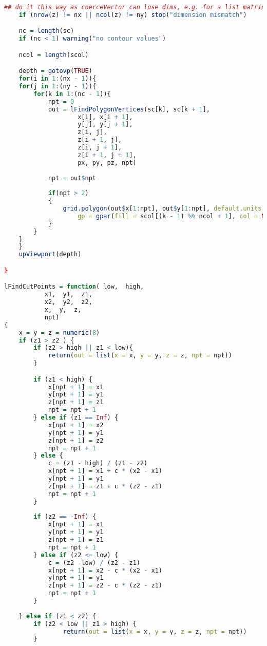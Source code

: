 \begin{lstlisting}[language = R]
    ## do it this way as coerceVector can lose dims, e.g. for a list matrix
    if (nrow(z) != nx || ncol(z) != ny) stop("dimension mismatch")

    nc = length(sc)
    if (nc < 1) warning("no contour values")

    ncol = length(scol)

    depth = gotovp(TRUE)
    for(i in 1:(nx - 1)){
    for(j in 1:(ny - 1)){
        for(k in 1:(nc - 1)){
            npt = 0
            out = lFindPolygonVertices(sc[k], sc[k + 1],
                    x[i], x[i + 1],
                    y[j], y[j + 1],
                    z[i, j],
                    z[i + 1, j],
                    z[i, j + 1],
                    z[i + 1, j + 1],
                    px, py, pz, npt)
            
            npt = out$npt
            
            if(npt > 2)
            { 
                grid.polygon(out$x[1:npt], out$y[1:npt], default.units = 'native',
                    gp = gpar(fill = scol[(k - 1) %% ncol + 1], col = NA), name = 'filled.contour')
            }
        }
    }
    }
    upViewport(depth)

}

lFindCutPoints = function( low,  high,
           x1,  y1,  z1,
           x2,  y2,  z2,
           x,  y,  z,
           npt)
{
    x = y = z = numeric(8)
    if (z1 > z2 ) {
        if (z2 > high || z1 < low){
            return(out = list(x = x, y = y, z = z, npt = npt))
        }

        if (z1 < high) {
            x[npt + 1] = x1
            y[npt + 1] = y1
            z[npt + 1] = z1
            npt = npt + 1
        } else if (z1 == Inf) {
            x[npt + 1] = x2
            y[npt + 1] = y1
            z[npt + 1] = z2
            npt = npt + 1
        } else {
            c = (z1 - high) / (z1 - z2)
            x[npt + 1] = x1 + c * (x2 - x1)
            y[npt + 1] = y1
            z[npt + 1] = z1 + c * (z2 - z1)
            npt = npt + 1
        }
        
        if (z2 == -Inf) {
            x[npt + 1] = x1
            y[npt + 1] = y1
            z[npt + 1] = z1
            npt = npt + 1
        } else if (z2 <= low) {
            c = (z2 -low) / (z2 - z1)
            x[npt + 1] = x2 - c * (x2 - x1)
            y[npt + 1] = y1
            z[npt + 1] = z2 - c * (z2 - z1)
            npt = npt + 1
        }
        
    } else if (z1 < z2) {
        if (z2 < low || z1 > high) {
                return(out = list(x = x, y = y, z = z, npt = npt))
        }
        

\end{lstlisting}
